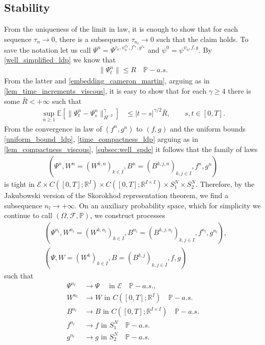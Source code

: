 \documentclass[a4paper,10pt]{amsart}
\newcommand{\R}{\mathbb{R}}
\theoremstyle{remark}
\numberwithin{equation}{section}
\begin{document}
\subsection{Stability}  From the uniqueness of the limit in law, it is enough to show that for each sequence $\tau_n\rightarrow 0$, there is a subsequence $\tau_{n_l}\rightarrow 0$ such that the claim holds. To save the notation let us call $\Psi^n=\Psi^{\tau_n,\psi^{\tau_n}_0,f^{\tau_n},g^{\tau_n}}$ and $\psi^0=\psi^{\psi_0,f,g}.$
By \cref{well_simplified_ldp} we know that 
\begin{align}\label{uniform_bound_ldp}
    \|\Psi^n_t\|\leq R \quad \mathbb{P}-a.s.
\end{align}
From the latter and \eqref{embedding_cameron_martin}, arguing as in
\cref{lem_time_increments_viscous}, it is easy to show that for each
$\gamma\geq 4$ there is some $\bar R<+\infty$ such that
	    \begin{align}\label{time_compactness_ldp}
	        \sup_{n\geq 1}\mathbb{E}
	        \left[\|\Psi^n_t-\Psi^n_s\|^{\gamma}_{H^{-2}}\right]
	        &\leq |t-s|^{\gamma/2}\bar{R},
	        \qquad s,t\in[0,T].
    \end{align}
    From the convergence in law of $(f^n,g^n)$ to $(f,g)$ and the uniform bounds \eqref{uniform_bound_ldp}, \eqref{time_compactness_ldp} arguing as in \cref{lem_compactness_viscous}, \cref{subsec:well_spde} it follows that 
    the family of laws
    \begin{align*}
        (\Psi^{n},W^n=(W^{k,n})_{k\in I}, B^n=(B^{k,j,n})_{k,j\in I},f^n,g^n)
    \end{align*}
    is tight in $\mathcal{E}\times C([0,T];\R^I)\times
    C([0,T];\R^{I\times I})\times S_1^N\times S_2^N$. Therefore, by the
    Jakubowski version of the Skorokhod representation theorem, we find a
    subsequence $n_l\rightarrow+\infty$. On an auxiliary probability space,
    which for simplicity we continue to call
    $(\Omega,\mathcal{F},\mathbb{P})$, we construct processes
\begin{align*}
&(\Psi^{n_l},W^{n_l}=(W^{k,n_l})_{k\in I}, B^{n_l}=(B^{k,j,n_l})_{k,j\in I},f^{n_l},g^{n_l}),\\
&(\Psi,W=(W^{k})_{k\in I},B=(B^{k,j})_{k,j\in I},f,g)
\end{align*}
such that
\begin{align*}
 \Psi^{n_l}&\rightarrow \Psi \quad\text{ in }\mathcal{E}\quad \mathbb{P}-a.s.,\\
 W^{n_l}&\rightarrow W \text{ in }C([0,T];\R^I)\quad \mathbb{P}-a.s.\\
  B^{n_l}&\rightarrow B \text{ in }C([0,T];\R^{I\times I})\quad \mathbb{P}-a.s.\\
  f^{n_l}&\rightarrow f \text{ in }S_1^N\quad \mathbb{P}-a.s.\\
  g^{n_l}&\rightarrow g \text{ in }S^N_2\quad \mathbb{P}-a.s.\\
\end{align*}
\end{document}
